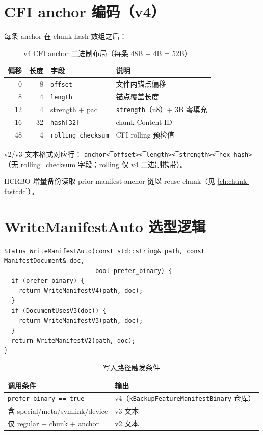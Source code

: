 \section{CFI anchor 编码（v4）}

每条 anchor 在 chunk hash 数组之后：

\begin{longtable}{@{}rrlp{5cm}@{}}
\caption{v4 CFI anchor 二进制布局（每条 48B + 4B = 52B）} \\
\toprule
偏移 & 长度 & 字段 & 说明 \\
\midrule
0 & 8 & \texttt{offset} & 文件内锚点偏移 \\
8 & 4 & \texttt{length} & 锚点覆盖长度 \\
12 & 4 & strength + pad & \texttt{strength}（u8）+ 3B 零填充 \\
16 & 32 & \texttt{hash[32]} & chunk Content ID \\
48 & 4 & \texttt{rolling\_checksum} & CFI rolling 预检值 \\
\bottomrule
\end{longtable}

v2/v3 文本格式对应行：
\texttt{anchor\t<offset>\t<length>\t<strength>\t<hex\_hash>}（无 rolling\_checksum 字段；rolling 仅 v4 二进制携带）。

HCRBO 增量备份读取 prior manifest anchor 链以 reuse chunk（见 \cref{ch:chunk-fastcdc}）。

\section{WriteManifestAuto 选型逻辑}

\begin{lstlisting}[caption={WriteManifestAuto},label={lst:write-manifest-auto}]
Status WriteManifestAuto(const std::string& path, const ManifestDocument& doc,
                         bool prefer_binary) {
  if (prefer_binary) {
    return WriteManifestV4(path, doc);
  }
  if (DocumentUsesV3(doc)) {
    return WriteManifestV3(path, doc);
  }
  return WriteManifestV2(path, doc);
}
\end{lstlisting}

\begin{table}[htbp]
\centering
\caption{写入路径触发条件}
\begin{tabular}{@{}ll@{}}
\toprule
调用条件 & 输出 \\
\midrule
\texttt{prefer\_binary == true} & v4（\texttt{kBackupFeatureManifestBinary} 仓库） \\
含 special/meta/symlink/device & v3 文本 \\
仅 regular + chunk + anchor & v2 文本 \\
\bottomrule
\end{tabular}
\end{table}

